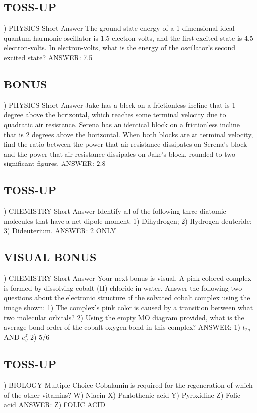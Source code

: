 \documentclass{article}
\begin{document}
\subsection*{TOSS-UP}
) PHYSICS Short Answer The ground-state energy of a 1-dimensional ideal quantum harmonic oscillator is 1.5 electron-volts, and the first excited state is 4.5 electron-volts. In electron-volts, what is the energy of the oscillator's second excited state?
\noindent ANSWER: 7.5

\subsection*{BONUS}
) PHYSICS Short Answer Jake has a block on a frictionless incline that is 1 degree above the horizontal, which reaches some terminal velocity due to quadratic air resistance. Serena has an identical block on a frictionless incline that is 2 degrees above the horizontal. When both blocks are at terminal velocity, find the ratio between the power that air resistance dissipates on Serena's block and the power that air resistance dissipates on Jake's block, rounded to two significant figures.
\noindent ANSWER: 2.8

\subsection*{TOSS-UP}
) CHEMISTRY Short Answer Identify all of the following three diatomic molecules that have a net dipole moment: 1) Dihydrogen; 2) Hydrogen deuteride; 3) Dideuterium.
\noindent ANSWER: 2 ONLY

\subsection*{VISUAL BONUS}
) CHEMISTRY Short Answer Your next bonus is visual. A pink-colored complex is formed by dissolving cobalt (II) chloride in water. Answer the following two questions about the electronic structure of the solvated cobalt complex using the image shown: 1) The complex's pink color is caused by a transition between what two molecular orbitals? 2) Using the empty MO diagram provided, what is the average bond order of the cobalt oxygen bond in this complex?
\noindent ANSWER: 1) $t_{2g}$ AND $e_{g}^{z}$ 2) $5/6$

\subsection*{TOSS-UP}
) BIOLOGY Multiple Choice Cobalamin is required for the regeneration of which of the other vitamins?
\noindent W) Niacin
\noindent X) Pantothenic acid
\noindent Y) Pyroxidine
\noindent Z) Folic acid
\noindent ANSWER: Z) FOLIC ACID
\end{document}
